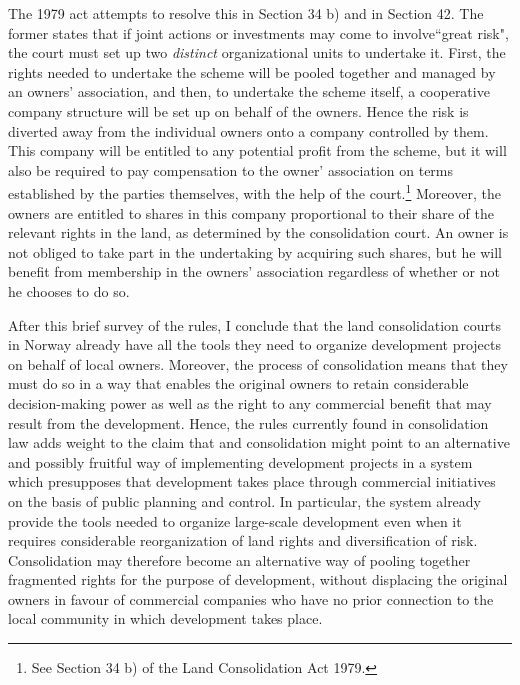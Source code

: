 The 1979 act attempts to resolve this in Section 34 b) and in Section 42. The former states that if joint actions or investments may come to involve``great risk", the court must set up two \emph{distinct} organizational units to undertake it. First, the rights needed to undertake the scheme will be pooled together and managed by an owners' association, and then, to undertake the scheme itself, a cooperative company structure will be set up on behalf of the owners. Hence the risk is diverted away from the individual owners onto a company controlled by them. This company will be entitled to any potential profit from the scheme, but it will also be required to pay compensation to the owner' association on terms established by the parties themselves, with the help of the court.\footnote{See Section 34 b) of the Land Consolidation Act 1979.} Moreover, the owners are entitled to shares in this company proportional to their share of the relevant rights in the land, as determined by the consolidation court. An owner is not obliged to take part in the undertaking by acquiring such shares, but he will benefit from membership in the owners' association regardless of whether or not he chooses to do so.

After this brief survey of the rules, I conclude that the land consolidation courts in Norway already have all the tools they need to organize development projects on behalf of local owners. Moreover, the process of consolidation means that they must do so in a way that enables the original owners to retain considerable decision-making power as well as the right to any commercial benefit that may result from the development. Hence, the rules currently found in consolidation law adds weight to the claim that and consolidation might point to an alternative and possibly fruitful way of implementing development projects in a system which presupposes that development takes place through commercial initiatives on the basis of public  planning and control. In particular, the system already provide the tools needed to organize large-scale development even when it requires considerable reorganization of land rights and diversification of risk. Consolidation may therefore become an alternative way of pooling together fragmented rights for the purpose of development, without displacing the original owners in favour of commercial companies who have no prior connection to the local community in which development takes place.

